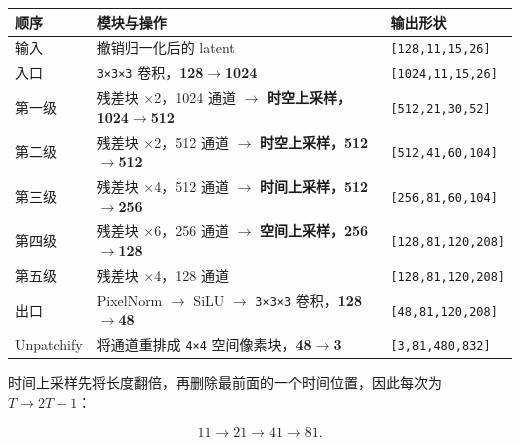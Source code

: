 \documentclass[
  11pt,
  a4paper,
  fontset=none]{ctexart}
\newcounter{none} %
\begin{document}
{\def\LTcaptype{none} %
\begin{longtable}[]{@{}
  >{\raggedright\arraybackslash}p{}
  >{\raggedright\arraybackslash}p{}
  >{\raggedright\arraybackslash}p{}@{}}
\toprule\noalign{}
\begin{minipage}[b]{\linewidth}\raggedright
顺序
\end{minipage} & \begin{minipage}[b]{\linewidth}\raggedright
模块与操作
\end{minipage} & \begin{minipage}[b]{\linewidth}\raggedright
输出形状
\end{minipage} \\
\midrule\noalign{}
\endhead
\bottomrule\noalign{}
\endlastfoot
输入 & 撤销归一化后的 latent & \texttt{{[}128,11,15,26{]}} \\
入口 & \texttt{3×3×3} 卷积，\textbf{128\(\rightarrow\)1024} &
\texttt{{[}1024,11,15,26{]}} \\
第一级 & 残差块 ×2，1024 通道 \(\rightarrow\)
\textbf{时空上采样，1024\(\rightarrow\)512} &
\texttt{{[}512,21,30,52{]}} \\
第二级 & 残差块 ×2，512 通道 \(\rightarrow\)
\textbf{时空上采样，512\(\rightarrow\)512} &
\texttt{{[}512,41,60,104{]}} \\
第三级 & 残差块 ×4，512 通道 \(\rightarrow\)
\textbf{时间上采样，512\(\rightarrow\)256} &
\texttt{{[}256,81,60,104{]}} \\
第四级 & 残差块 ×6，256 通道 \(\rightarrow\)
\textbf{空间上采样，256\(\rightarrow\)128} &
\texttt{{[}128,81,120,208{]}} \\
第五级 & 残差块 ×4，128 通道 & \texttt{{[}128,81,120,208{]}} \\
出口 & PixelNorm \(\rightarrow\) SiLU \(\rightarrow\) \texttt{3×3×3}
卷积，\textbf{128\(\rightarrow\)48} & \texttt{{[}48,81,120,208{]}} \\
Unpatchify & 将通道重排成 \texttt{4×4}
空间像素块，\textbf{48\(\rightarrow\)3} & \texttt{{[}3,81,480,832{]}} \\
\end{longtable}
}

\endgroup

时间上采样先将长度翻倍，再删除最前面的一个时间位置，因此每次为
\textbf{\(T\rightarrow2T-1\)}：

\[
11\rightarrow21\rightarrow41\rightarrow81.
\]
\end{document}
